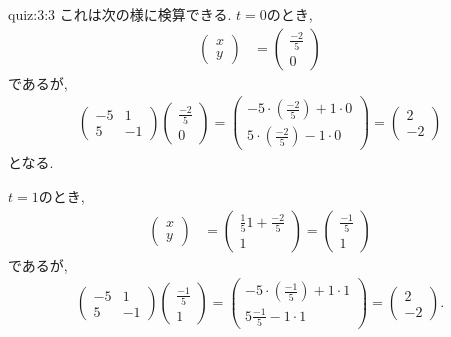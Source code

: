 \begin{answerof}{quiz:3:3}
  これは次の様に検算できる.
  $t=0$のとき,
  \begin{align*}
      \begin{pmatrix}x\\y\end{pmatrix}
        &=\begin{pmatrix}\frac{-2}{5}\\0\end{pmatrix}
  \end{align*}
  であるが,
  \begin{align*}
    \begin{pmatrix}-5&1\\5&-1\end{pmatrix}
      \begin{pmatrix}\frac{-2}{5}\\0\end{pmatrix}
        =
    \begin{pmatrix}-5\cdot(\frac{-2}{5})+1\cdot 0 \\5\cdot(\frac{-2}{5})-1\cdot 0\end{pmatrix}
        =
    \begin{pmatrix}2 \\-2\end{pmatrix}
  \end{align*}
  となる.
  
  $t=1$のとき,
  \begin{align*}
      \begin{pmatrix}x\\y\end{pmatrix}
        &=\begin{pmatrix}\frac{1}{5}1+\frac{-2}{5}\\1\end{pmatrix}
        =\begin{pmatrix}\frac{-1}{5}\\1\end{pmatrix}
  \end{align*}
  であるが,
  \begin{align*}
    \begin{pmatrix}-5&1\\5&-1\end{pmatrix}
      \begin{pmatrix}\frac{-1}{5}\\1\end{pmatrix}
        =
    \begin{pmatrix}-5\cdot(\frac{-1}{5})+1\cdot 1 \\5 \frac{-1}{5}-1\cdot 1 \end{pmatrix}
        =
    \begin{pmatrix}2 \\-2\end{pmatrix}.
  \end{align*}
  
\end{answerof}

